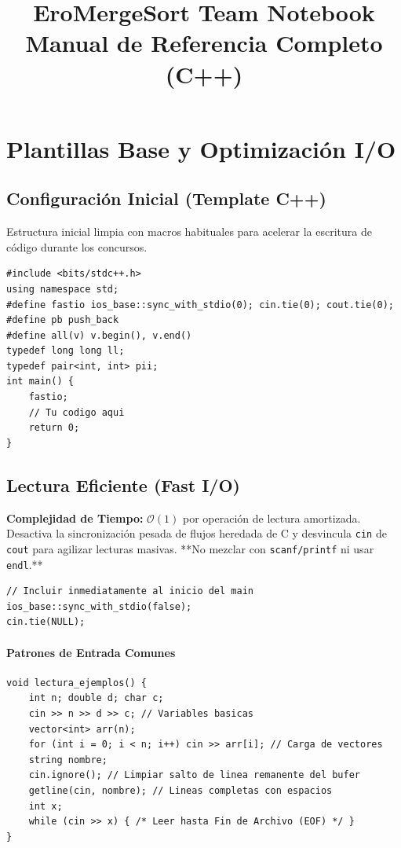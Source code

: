 \documentclass[10pt,twocolumn,letterpaper]{report}
\begin{document}
\title{\vspace{-0.5in}\Huge \bfseries EroMergeSort Team Notebook \\ \Large Manual de Referencia Completo (C++)}
\author{\large }
\maketitle
\thispagestyle{fancy}
\tableofcontents
\newpage
\chapter{Plantillas Base y Optimización I/O}
\section{Configuración Inicial (Template C++)}
Estructura inicial limpia con macros habituales para acelerar la escritura de código durante los concursos.
\begin{lstlisting}
#include <bits/stdc++.h>
using namespace std;
#define fastio ios_base::sync_with_stdio(0); cin.tie(0); cout.tie(0);
#define pb push_back
#define all(v) v.begin(), v.end()
typedef long long ll;
typedef pair<int, int> pii;
int main() {
    fastio;
    // Tu codigo aqui
    return 0;
}
\end{lstlisting}
\section{Lectura Eficiente (Fast I/O)}
\textbf{Complejidad de Tiempo:} $\mathcal{O}(1)$ por operación de lectura amortizada. \\
Desactiva la sincronización pesada de flujos heredada de C y desvincula \texttt{cin} de \texttt{cout} para agilizar lecturas masivas. **No mezclar con \texttt{scanf/printf} ni usar \texttt{endl}.**
\begin{lstlisting}
// Incluir inmediatamente al inicio del main
ios_base::sync_with_stdio(false);
cin.tie(NULL);
\end{lstlisting}
\subsubsection{Patrones de Entrada Comunes}
\begin{lstlisting}
void lectura_ejemplos() {
    int n; double d; char c;
    cin >> n >> d >> c; // Variables basicas
    vector<int> arr(n);
    for (int i = 0; i < n; i++) cin >> arr[i]; // Carga de vectores
    string nombre;
    cin.ignore(); // Limpiar salto de linea remanente del bufer
    getline(cin, nombre); // Lineas completas con espacios
    int x;
    while (cin >> x) { /* Leer hasta Fin de Archivo (EOF) */ }
}
\end{lstlisting}
\end{document}

